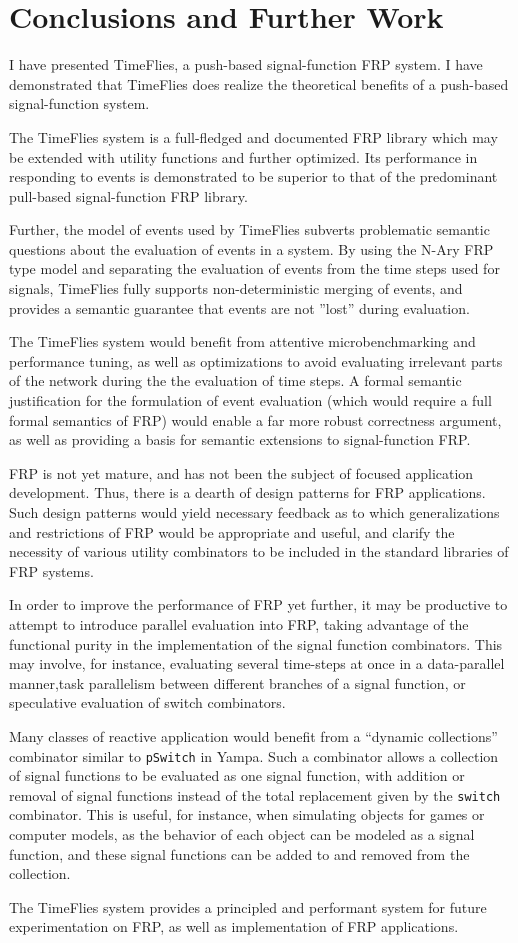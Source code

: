 \chapter{Conclusions and Further Work}
\label{chapter:Conclusions_and_Further_Work}
I have presented TimeFlies, a push-based signal-function FRP system. I have
demonstrated that TimeFlies does realize the theoretical benefits of a
push-based signal-function system.

The TimeFlies system is a full-fledged and documented FRP library which may
be extended with utility functions and further optimized. Its performance in
responding to events is demonstrated to be superior to that of the predominant
pull-based signal-function FRP library.

Further, the model of events used by TimeFlies subverts problematic semantic
questions about the evaluation of events in a system. By using the N-Ary FRP
type model and separating the evaluation of events from the time steps used
for signals, TimeFlies fully supports non-deterministic merging of events,
and provides a semantic guarantee that events are not ''lost'' during evaluation.

The TimeFlies system would benefit from attentive microbenchmarking and performance
tuning, as well as optimizations to avoid evaluating irrelevant parts of the network
during the the evaluation of time steps. A formal semantic justification for the
formulation of event evaluation (which would require a full formal semantics of FRP)
would enable a far more robust correctness argument, as well as providing a basis for
semantic extensions to signal-function FRP.

FRP is not yet mature, and has not been the subject of focused application development.
Thus, there is a dearth of design patterns for FRP applications. Such design patterns
would yield necessary feedback as to which generalizations and restrictions of FRP would
be appropriate and useful, and clarify the necessity of various utility combinators to
be included in the standard libraries of FRP systems.

In order to improve the performance of FRP yet further, it may be productive to attempt
to introduce parallel evaluation into FRP, taking advantage of the functional purity in
the implementation of the signal function combinators. This may involve, for instance,
evaluating several time-steps at once in a data-parallel manner,task parallelism
between different branches of a signal function, or speculative evaluation of switch
combinators.

Many classes of reactive application would benefit from a ``dynamic collections'' combinator
similar to {\tt pSwitch} in Yampa. Such a combinator allows a collection of signal functions
to be evaluated as one signal function, with addition or removal of signal functions instead
of the total replacement given by the {\tt switch} combinator. This is useful, for instance,
when simulating objects for games or computer models, as the behavior of each object can be
modeled as a signal function, and these signal functions can be added to and removed from the
collection.

The TimeFlies system provides a principled and performant system for future experimentation
on FRP, as well as implementation of FRP applications.
